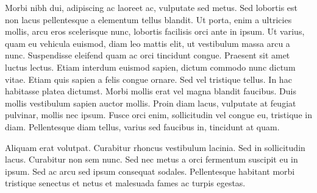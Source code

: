 Morbi nibh dui, adipiscing ac laoreet ac, vulputate sed metus. Sed lobortis est non lacus pellentesque a elementum tellus blandit. Ut porta, enim a ultricies mollis, arcu eros scelerisque nunc, lobortis facilisis orci ante in ipsum. Ut varius, quam eu vehicula euismod, diam leo mattis elit, ut vestibulum massa arcu a nunc. Suspendisse eleifend quam ac orci tincidunt congue. Praesent sit amet luctus lectus. Etiam interdum euismod sapien, dictum commodo nunc dictum vitae. Etiam quis sapien a felis congue ornare. Sed vel tristique tellus. In hac habitasse platea dictumst. Morbi mollis erat vel magna blandit faucibus. Duis mollis vestibulum sapien auctor mollis. Proin diam lacus, vulputate at feugiat pulvinar, mollis nec ipsum. Fusce orci enim, sollicitudin vel congue eu, tristique in diam. Pellentesque diam tellus, varius sed faucibus in, tincidunt at quam.

Aliquam erat volutpat. Curabitur rhoncus vestibulum lacinia. Sed in sollicitudin lacus. Curabitur non sem nunc. Sed nec metus a orci fermentum suscipit eu in ipsum. Sed ac arcu sed ipsum consequat sodales. Pellentesque habitant morbi tristique senectus et netus et malesuada fames ac turpis egestas.